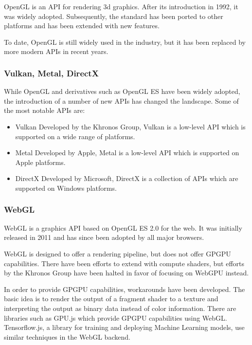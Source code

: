 OpenGL is an API for rendering 3d graphics. After its introduction in 1992, it was widely adopted. Subsequently, the standard has been ported to other platforms and has been extended with new features.

To date, OpenGL is still widely used in the industry, but it has been replaced by more modern APIs in recent years.

\subsubsection{Vulkan, Metal, DirectX}

While OpenGL and derivatives such as OpenGL ES have been widely adopted, the introduction of a number of new APIs has changed the landscape. Some of the most notable APIs are:

\begin{itemize}
    \item{Vulkan} Developed by the Khronos Group, Vulkan is a low-level API which is supported on a wide range of platforms.
    \item{Metal} Developed by Apple, Metal is a low-level API which is supported on Apple platforms.
    \item{DirectX} Developed by Microsoft, DirectX is a collection of APIs which are supported on Windows platforms.
\end{itemize}

\subsubsection{WebGL}

WebGL is a graphics API based on OpenGL ES 2.0 for the web. It was initially released in 2011 and has since been adopted by all major browsers.

WebGL is designed to offer a rendering pipeline, but does not offer GPGPU capabilities. There have been efforts to extend with compute shaders, but efforts by the Khronos Group have been halted in favor of focusing on WebGPU instead.

In order to provide GPGPU capabilities, workarounds have been developed. The basic idea is to render the output of a fragment shader to a texture and interpreting the output as binary data instead of color information.
There are libraries such as GPU.js which provide GPGPU capabilities using WebGL. Tensorflow.js, a library for training and deploying Machine Learning models, use similar techniques in the WebGL backend.

